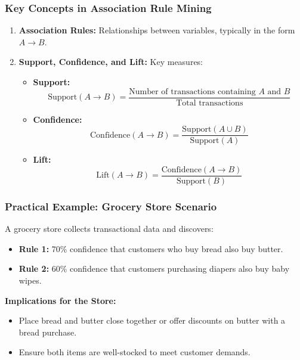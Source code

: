 \documentclass[aspectratio=169]{beamer}
\begin{document}
\begin{frame}[fragile]
    \frametitle{Key Concepts in Association Rule Mining}
    \begin{enumerate}
        \item \textbf{Association Rules:} Relationships between variables, typically in the form \( A \rightarrow B \).
        \item \textbf{Support, Confidence, and Lift:} Key measures:
        \begin{itemize}
            \item \textbf{Support:} 
            \[
            \text{Support}(A \rightarrow B) = \frac{\text{Number of transactions containing } A \text{ and } B}{\text{Total transactions}}
            \]
            
            \item \textbf{Confidence:} 
            \[
            \text{Confidence}(A \rightarrow B) = \frac{\text{Support}(A \cup B)}{\text{Support}(A)}
            \]

            \item \textbf{Lift:} 
            \[
            \text{Lift}(A \rightarrow B) = \frac{\text{Confidence}(A \rightarrow B)}{\text{Support}(B)}
            \]
        \end{itemize}
    \end{enumerate}
\end{frame}

\begin{frame}[fragile]
    \frametitle{Practical Example: Grocery Store Scenario}
    A grocery store collects transactional data and discovers:
    
    \begin{itemize}
        \item \textbf{Rule 1:} 70\% confidence that customers who buy bread also buy butter.
        \item \textbf{Rule 2:} 60\% confidence that customers purchasing diapers also buy baby wipes.
    \end{itemize}

    \textbf{Implications for the Store:}
    \begin{itemize}
        \item Place bread and butter close together or offer discounts on butter with a bread purchase.
        \item Ensure both items are well-stocked to meet customer demands.
    \end{itemize}
\end{frame}
\end{document}

